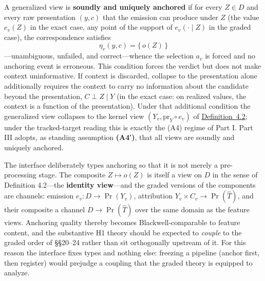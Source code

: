 \begin{thmdef}

A generalized view is \textbf{soundly and uniquely anchored} if for every \(Z \in D\) and every raw presentation \((y,c)\) that the emission can produce under \(Z\) (the value \(e_v(Z)\) in the exact case, any point of the support of \(e_v(\cdot\mid Z)\) in the graded case), the correspondence satisfies
\[
\eta_v(y, c) = \{\,o(Z)\,\}
\]
---\hspace{0pt}unambiguous, unfailed, and correct---\hspace{0pt}whence the selection \(a_v\) is forced and no anchoring event is erroneous. This condition forces the verdict but does not make context uninformative. If context is discarded, collapse to the presentation alone additionally requires the context to carry no information about the candidate beyond the presentation, \(C\perp Z\mid Y\) (in the exact case: on realized values, the context is a function of the presentation). Under that additional condition the generalized view collapses to the kernel view \((Y_v, \mathrm{pr}_Y \circ e_v)\) of \hyperlink{stmt:4.2}{Definition~4.2}; under the tracked-target reading this is exactly the (A4) regime of Part I. Part III adopts, as standing assumption \textbf{(A4′)}, that all views are soundly and uniquely anchored.
\end{thmdef}

\begin{thmrem}

The interface deliberately types anchoring so that it is not merely a pre-processing stage. The composite \(Z \mapsto o(Z)\) is itself a view on \(D\) in the sense of Definition 4.2---\hspace{0pt}the \textbf{identity view}---\hspace{0pt}and the graded versions of the components are channels: emission \(e_v : D \to \Pr(Y_v)\), attribution \(Y_v \times C_v \to \Pr(\widehat{T})\), and their composite a channel \(D \to \Pr(\widehat{T})\) over the same domain as the feature views. Anchoring quality thereby becomes Blackwell-comparable to feature content, and the substantive H1 theory should be expected to \emph{couple} to the graded order of §§20--24 rather than sit orthogonally upstream of it. For this reason the interface fixes types and nothing else: freezing a pipeline (anchor first, then register) would prejudge a coupling that the graded theory is equipped to analyze.
\end{thmrem}

